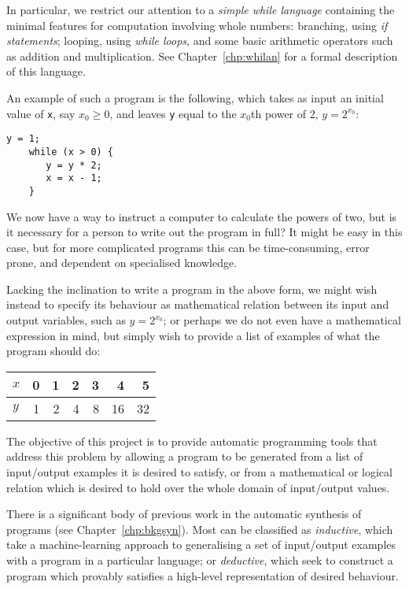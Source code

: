 \documentclass[a4paper,twoside,notitlepage]{report}
\begin{document}
In particular, we restrict our attention to a \emph{simple while language} 
containing the minimal features for computation involving whole numbers: 
branching, using \emph{if statements}; looping, using \emph{while loops}, 
and some basic arithmetic operators such as addition and multiplication.
See Chapter~\ref{chp:whilan} for a formal description of this language.

An example of such a program is the following, which takes as input an initial 
value of \texttt{x}, say $x_0 \ge 0$, and leaves \texttt{y} equal to the 
$x_0$th power of 2, $y = 2^{x_0}$:
\begin{Verbatim}[samepage=true]
    y = 1;
    while (x > 0) {
       y = y * 2;
       x = x - 1;
    }
\end{Verbatim}

We now have a way to instruct a computer to calculate the powers of two, 
but is it necessary for a person to write out the program in full? It 
might be easy in this case, but for more complicated programs this can be 
time-consuming, error prone, and dependent on specialised knowledge.

Lacking the inclination to write a program in the above form, we might 
wish instead to specify its behaviour as mathematical relation between 
its input and output variables, such as $y = 2^{x_0}$; or perhaps we do not 
even have a mathematical expression in mind, but simply wish to provide a 
list of examples of what the program should do:
\begin{center}
\begin{tabular}{| l || r | r | r | r | r | r |}
    \hline
    $x$ & 0 & 1 & 2 & 3 & 4  &  5 \\
    \hline
    $y$ & 1 & 2 & 4 & 8 & 16 & 32 \\
    \hline
\end{tabular}
\end{center}

The objective of this project is to provide automatic programming tools 
that address this problem by allowing a program to be generated from a 
list of input/output examples it is desired to satisfy, or from a 
mathematical or logical relation which is desired to hold over the whole 
domain of input/output values.

There is a significant body of previous work in the automatic synthesis of 
programs (see Chapter~\ref{chp:bkgsyn}). Most can be classified as 
\emph{inductive}, which take a machine-learning approach to generalising a set 
of input/output examples with a program in a particular language; or 
\emph{deductive}\cite{cheatham86}\cite{bundy90}\cite{colon05}, which seek to 
construct a program which provably satisfies a high-level representation of 
desired behaviour.
\end{document}
